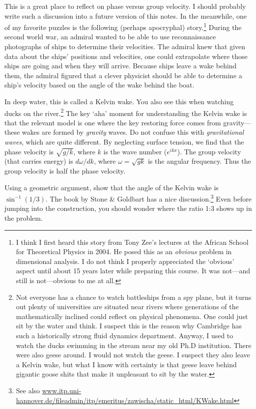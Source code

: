 \begin{exercise}
This is a great place to reflect on phase versus group velocity. I should probably write such a discussion into a future version of this notes.  In the meanwhile, one of my favorite puzzles is the following (perhaps apocryphal) story.\footnote{I think I first heard this story from Tony Zee's lectures at the African School for Theoretical Physics in 2004. He posed this as an \emph{obvious} problem in dimensional analysis. I do not think I properly appreciated the `obvious' aspect until about 15 years later while preparing this course. It was not---and still is not---obvious to me at all.} During the second world war, an admiral wanted to be able to use reconnaissance photographs of ships to determine their velocities. The admiral knew that given data about the ships' positions and velocities, one could extrapolate where those ships are going and when they will arrive. Because ships leave a wake behind them, the admiral figured that a clever physicist should be able to determine a ship's velocity based on the angle of the wake behind the boat.

In deep water, this is called a Kelvin wake. You also see this when watching ducks on the river.\footnote{Not everyone has a chance to watch battleships from a spy plane, but it turns out plenty of universities are situated near rivers where generations of the mathematically inclined could reflect on physical phenomena. One could just sit by the water and think. I suspect this is the reason why Cambridge has such a historically strong fluid dynamics department. Anyway, I used to watch the ducks swimming in the stream near my old Ph.D institution. There were also geese around. I would not watch the geese. I suspect they also leave a Kelvin wake, but what I know with certainty is that geese leave behind gigantic goose shits that make it unpleasant to sit by the water.} The key `aha' moment for understanding the Kelvin wake is that the relevant model is one where the key restoring force comes from gravity---these wakes are formed by \emph{gravity} waves. Do not confuse this with \emph{gravitational waves}, which are quite different. By neglecting surface tension, we find that the phase velocity is $\sqrt{g/k}$, where $k$ is the wave number ($e^{ikx}$). The group velocity (that carries energy) is $d\omega/dk$, where $\omega=\sqrt{gk}$ is the angular frequency. Thus the group velocity is half the phase velocity. 

Using a geometric argument, show that the angle of the Kelvin wake is $\sin^{-1}(1/3)$. The book by Stone \& Goldbart has a nice discussion.\footnote{See also \url{www.itp.uni-hannover.de/fileadmin/itp/emeritus/zawischa/static_html/KWake.html}} Even before jumping into the construction, you should wonder where the ratio 1:3 shows up in the problem. 
\end{exercise}


